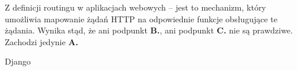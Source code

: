 \begin{solutions}
    Z definicji routingu w aplikacjach webowych -- jest to mechanizm, który umożliwia mapowanie żądań HTTP na odpowiednie funkcje obsługujące te żądania. Wynika stąd, że ani podpunkt \textbf{B.}, ani podpunkt \textbf{C.} nie są prawdziwe. Zachodzi jedynie \textbf{A.}

    \sol Django
    
\end{solutions}
